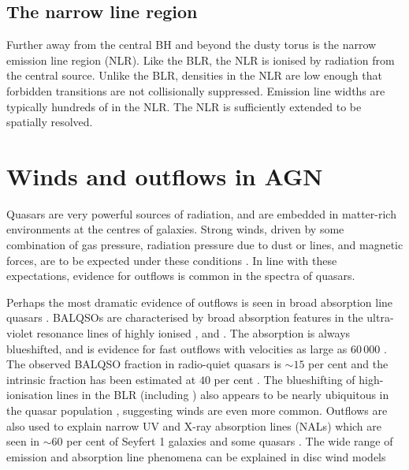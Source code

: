 \subsection{The narrow line region}

Further away from the central BH and beyond the dusty torus is the narrow emission line region (NLR). 
Like the BLR, the NLR is ionised by radiation from the central source. 
Unlike the BLR, densities in the NLR are low enough that forbidden transitions are not collisionally suppressed. 
Emission line widths are typically hundreds of \kms in the NLR. 
The NLR is sufficiently extended to be spatially resolved. 

\section{Winds and outflows in AGN}

Quasars are very powerful sources of radiation, and are embedded in matter-rich environments at the centres of galaxies.
Strong winds, driven by some combination of gas pressure, radiation pressure due to dust or lines, and magnetic forces, are to be expected under these conditions \citep[e.g.][]{blandford82b,proga00,everett05}. 
In line with these expectations, evidence for outflows is common in the spectra of quasars. 

Perhaps the most dramatic evidence of outflows is seen in broad absorption line quasars \citep[BALQSOs;][]{weymann91}.
BALQSOs are characterised by broad absorption features in the ultra-violet resonance lines of highly ionised ,  and . 
The absorption is always blueshifted, and is evidence for fast outflows with velocities as large as 60\,000 \kms \citep[e.g.][]{turnshek88}. 
The observed  BALQSO fraction in radio-quiet quasars is $\sim15$ per cent \citep[e.g.][]{hewett03,reichard03} and the intrinsic fraction has been estimated at $40$ per cent \citep{allen11}.
The blueshifting of high-ionisation lines in the BLR (including ) also appears to be nearly ubiquitous in the quasar population \citep[e.g.][]{richards02,richards11}, suggesting winds are even more common.
Outflows are also used to explain narrow UV and X-ray absorption lines (NALs) which are seen in $\sim60$ per cent of Seyfert 1 galaxies \citep{crenshaw99} and some quasars \citep[e.g.][]{hamann97}. 
The wide range of emission and absorption line phenomena can be explained in disc wind models \citep[e.g.][]{murray95,elvis00,proga00,everett05}

